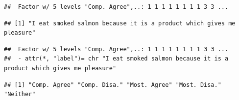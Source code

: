 \documentclass[
]{book}
\newenvironment{Shaded}{\begin{snugshade}}{\end{snugshade}}
\newcommand{\CommentTok}[1]{\textcolor[rgb]{0.56,0.35,0.01}{\textit{#1}}}
\newcommand{\FunctionTok}[1]{\textcolor[rgb]{0.00,0.00,0.00}{#1}}
\newcommand{\NormalTok}[1]{#1}
\newcommand{\OtherTok}[1]{\textcolor[rgb]{0.56,0.35,0.01}{#1}}
\newcommand{\SpecialCharTok}[1]{\textcolor[rgb]{0.00,0.00,0.00}{#1}}
\newcommand{\StringTok}[1]{\textcolor[rgb]{0.31,0.60,0.02}{#1}}
\begin{document}
\begin{Shaded}
\end{Shaded}

\begin{verbatim}
##  Factor w/ 5 levels "Comp. Agree",..: 1 1 1 1 1 1 1 1 3 3 ...
\end{verbatim}

\begin{Shaded}
\end{Shaded}

\begin{verbatim}
## [1] "I eat smoked salmon because it is a product which gives me pleasure"
\end{verbatim}

\begin{Shaded}
\end{Shaded}

\begin{verbatim}
##  Factor w/ 5 levels "Comp. Agree",..: 1 1 1 1 1 1 1 1 3 3 ...
##  - attr(*, "label")= chr "I eat smoked salmon because it is a product which gives me pleasure"
\end{verbatim}

\begin{Shaded}
\end{Shaded}

\begin{verbatim}
## [1] "Comp. Agree" "Comp. Disa." "Most. Agree" "Most. Disa." "Neither"
\end{verbatim}
\end{document}
